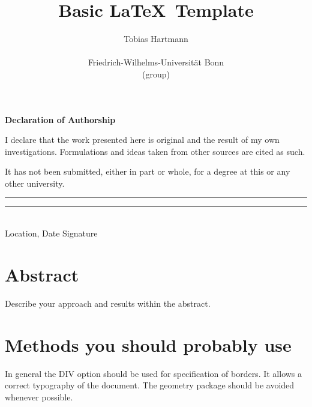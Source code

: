 \documentclass[12pt, %
               a4paper, %
               twoside, %
               openright, %
               abstract=on, %
               DIV=11,      %
               BCOR=8mm]{scrbook} %
\begin{document}
\pagestyle{headings}  %
\title{Basic \LaTeX \, Template}
\author{Tobias Hartmann\\ \begin{minipage}{8cm}\centering \small Friedrich-Wilhelms-Universität Bonn\\ \small (group)\end{minipage}}

\vspace{4cm}

\cleardoublepage
\thispagestyle{empty}
{\noindent%
\huge{\textbf{\textsf{Declaration of Authorship}}}
}
\vspace{2cm}
\begin{flushleft}
\noindent%
I declare that the work presented here is original and the result of my own investigations.
Formulations and ideas taken from other sources are cited as such.

It has not been submitted, either in part or whole, for a degree at this or any other university.
\end{flushleft}

\vspace{8cm}
\noindent%
\rule[1em]{8em}{0.5pt}  \hfill \rule[1em]{8em}{0.5pt}\\ %
Location, Date \hfill Signature\\


\cleardoublepage


\chapter*{Abstract}
\thispagestyle{empty}
Describe your approach and results within the abstract.


\newpage
{}
\setcounter{page}{1}
\tableofcontents
\listoffigures
\listofalgorithms

\newpage
\mainmatter


\chapter{Methods you should probably use}
In general the DIV option should be used for specification of borders.
It allows a correct typography of the document.
The geometry package should be avoided whenever possible.
\end{document}
